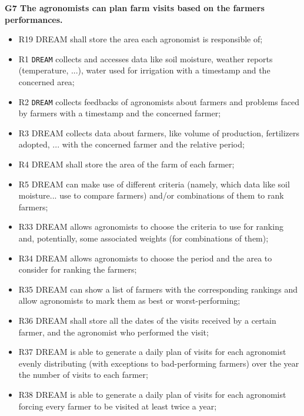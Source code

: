 \documentclass{article}
\begin{document}
\vspace{5mm}
\textbf{G7 The agronomists can plan farm visits based on the farmers performances.}
\begin{itemize}
    \item R19 DREAM shall store the area each agronomist is responsible of;

    \item R1 \verb|DREAM| collects and accesses data like soil moisture, weather reports (temperature, ...), water used for irrigation with a timestamp and the concerned area;

    \item R2 \verb|DREAM| collects feedbacks of agronomists about farmers and problems faced by farmers with a timestamp and the concerned farmer;

    \item R3 DREAM collects data about farmers, like volume of production, fertilizers adopted, ... with the concerned farmer and the relative period;

    \item R4 DREAM shall store the area of the farm of each farmer;

    \item R5 DREAM can make use of different criteria (namely, which data like soil moisture... use to compare farmers) and/or combinations of them to rank farmers;

    \item R33 DREAM allows agronomists to choose the criteria to use for ranking and, potentially, some associated weights (for combinations of them);

    \item R34 DREAM allows agronomists to choose the period and the area to consider for ranking the farmers;

    \item R35 DREAM can show a list of farmers with the corresponding rankings and allow agronomists to mark them as best or worst-performing;

    \item R36 DREAM shall store all the dates of the visits received by a certain farmer, and the agronomist who performed the visit;

\item R37 DREAM is able to generate a daily plan of visits for each agronomist evenly distributing (with exceptions to bad-performing farmers) over the year the number of visits to each farmer;

\item R38 DREAM is able to generate a daily plan of visits for each agronomist forcing every farmer to be visited at least twice a year;


\end{itemize}
\end{document}
